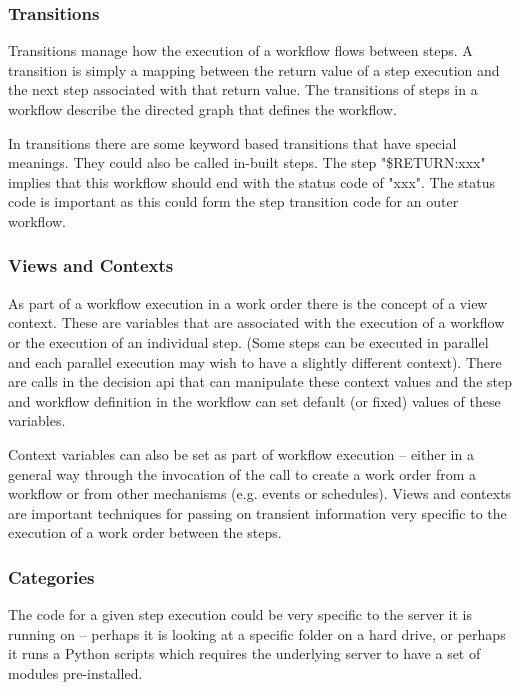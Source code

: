 \subsubsection{Transitions}

Transitions manage how the execution of a workflow flows between steps. A transition is simply a mapping between
the return value of a step execution and the next step associated with that return value. The transitions of steps
in a workflow describe the directed graph that defines the workflow.

In transitions there are some keyword based transitions that have special meanings. They could also be called in-built
steps. The step "\$RETURN:xxx" implies that this workflow should end with the status code of "xxx". The status code is
important as this could form the step transition code for an outer workflow.

\subsubsection{Views and Contexts}

As part of a workflow execution in a work order there is the concept of a view context. These are variables
that are associated with the execution of a workflow or the execution of an individual step. (Some steps can be executed in
parallel and each parallel execution may wish to have a slightly different context). There are calls in the decision api
that can manipulate these context values and the step and workflow definition in the workflow can set default (or fixed) values
of these variables.

Context variables can also be set as part of workflow execution -- either in a general way through the invocation of the call
to create a work order from a workflow or from other mechanisms (e.g. events or schedules). Views and contexts are important
techniques for passing on transient information very specific to the execution of a work order between the steps.

\subsubsection{Categories}

The code for a given step execution could be very specific to the server it is running on -- perhaps it is looking at
a specific folder on a hard drive, or perhaps it runs a Python scripts which requires the underlying server to have a set
of modules pre-installed.

